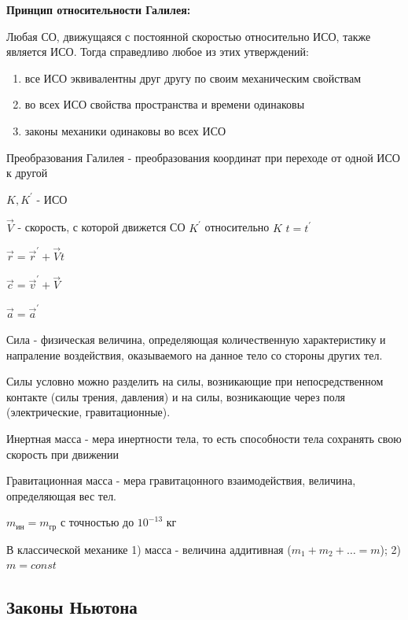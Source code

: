 \documentclass[12pt]{article}
\begin{document}
    \mediumvspace

    \textbf{Принцип относительности Галилея:}

    Любая СО, движущаяся с постоянной скоростью относительно ИСО, также является ИСО. Тогда справедливо любое из этих утверждений:

    \begin{enumerate}
        \item все ИСО эквивалентны друг другу по своим механическим свойствам
        \item во всех ИСО свойства пространства и времени одинаковы
        \item законы механики одинаковы во всех ИСО
    \end{enumerate}


    Преобразования Галилея - преобразования координат при переходе от одной ИСО к другой

    $K, K^\prime$ - ИСО

    $\vec{V}$ - скорость, с которой движется СО $K^\prime$ относительно $K$
    $t = t^\prime$

    $\vec{r} = \vec{r}^\prime + \vec{V}t$

    $\vec{c} = \vec{v}^\prime + \vec{V}$

    $\vec{a} = \vec{a}^\prime$

    \Def Сила - физическая величина, определяющая количественную характеристику и напраление воздействия, оказываемого на данное тело
    со стороны других тел.

    Силы условно можно разделить на силы, возникающие при непосредственном контакте (силы трения, давления) и на силы,
    возникающие через поля (электрические, гравитационные).

    \Def Инертная масса - мера инертности тела, то есть способности тела сохранять свою скорость при движении

    \Def Гравитационная масса - мера гравитацонного взаимодействия, величина, определяющая вес тел.

    $m_{\text{ин}} = m_{\text{гр}}$ с точностью до $10^{-13}$ кг

    В классической механике 1) масса - величина аддитивная ($m_1 + m_2 + \dots = m$); 2) $m = const$


    \subsection{Законы Ньютона}
\end{document}

